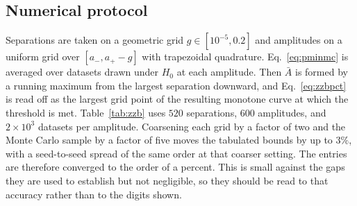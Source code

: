 \documentclass[%
 twocolumn,
 amsmath,amssymb,
prx,
longbibliography
]{revtex4-2}
\begin{document}
\subsection{Numerical protocol}\label{app:zzb:protocol}

Separations are taken on a geometric grid $g \in [10^{-5}, 0.2]$ and amplitudes on a uniform grid over $[a_-, a_+ - g]$ with trapezoidal quadrature. Eq.~\eqref{eq:pminmc} is averaged over datasets drawn under $H_0$ at each amplitude. Then $\bar A$ is formed by a running maximum from the largest separation downward, and Eq.~\eqref{eq:zzbpct} is read off as the largest grid point of the resulting monotone curve at which the threshold is met. Table~\ref{tab:zzb} uses $520$ separations, $600$ amplitudes, and $2\times 10^3$ datasets per amplitude. Coarsening each grid by a factor of two and the Monte Carlo sample by a factor of five moves the tabulated bounds by up to $3\%$, with a seed-to-seed spread of the same order at that coarser setting. The entries are therefore converged to the order of a percent. This is small against the gaps they are used to establish but not negligible, so they should be read to that accuracy rather than to the digits shown.
\end{document}
